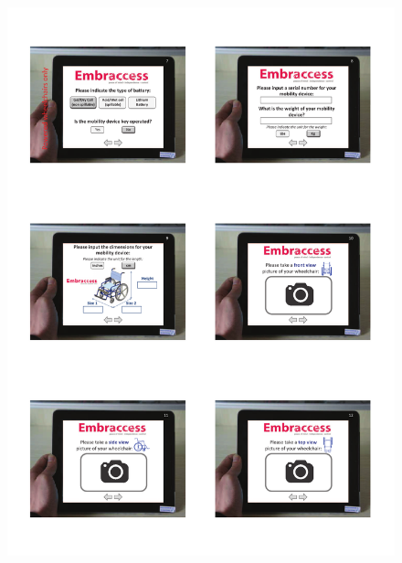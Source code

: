 \begin{figure}[h]
  \centering
     \includegraphics[scale=0.75]{images/App_UI_2.pdf}
  \label{fig:App_UI_2}
\end{figure}

